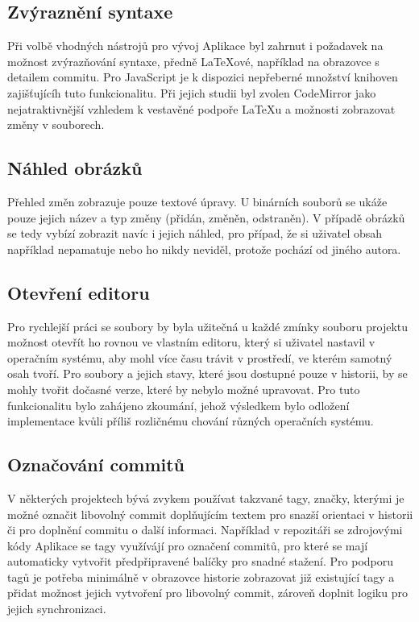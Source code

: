 \subsection{Zvýraznění syntaxe}

Při volbě vhodných nástrojů pro vývoj Aplikace byl zahrnut i požadavek na možnost zvýrazňování syntaxe, předně \LaTeX{ové}, například na obrazovce s detailem commitu. Pro JavaScript je k dispozici nepřeberné množství knihoven zajišťujícíh tuto funkcionalitu. Při jejich studii byl zvolen CodeMirror jako nejatraktivnější vzhledem k vestavěné podpoře \LaTeX{u} a možnosti zobrazovat změny v souborech.

\subsection{Náhled obrázků}

Přehled změn zobrazuje pouze textové úpravy. U binárních souborů se ukáže pouze jejich název a typ změny (přidán, změněn, odstraněn). V případě obrázků se tedy vybízí zobrazit navíc i jejich náhled, pro případ, že si uživatel obsah například nepamatuje nebo ho nikdy neviděl, protože pochází od jiného autora.

\subsection{Otevření editoru}

Pro rychlejší práci se soubory by byla užitečná u každé zmínky souboru projektu možnost otevřít ho rovnou ve vlastním editoru, který si uživatel nastavil v operačním systému, aby mohl více času trávit v prostředí, ve kterém samotný osah tvoří. Pro soubory a jejich stavy, které jsou dostupné pouze v historii, by se mohly tvořit dočasné verze, které by nebylo možné upravovat. Pro tuto funkcionalitu bylo zahájeno zkoumání, jehož výsledkem bylo odložení implementace kvůli příliš rozličnému chování různých operačních systému.

\subsection{Označování commitů}

V některých projektech bývá zvykem používat takzvané tagy, značky, kterými je možné označit libovolný commit doplňujícím textem pro snazší orientaci v historii či pro doplnění commitu o další informaci. Například v repozitáři se zdrojovými kódy Aplikace se tagy využívájí pro označení commitů, pro které se mají automaticky vytvořit předpřipravené balíčky pro snadné stažení. Pro podporu tagů je potřeba minimálně v obrazovce historie zobrazovat již existující tagy a přidat možnost jejich vytvoření pro libovolný commit, zároveň doplnit logiku pro jejich synchronizaci.


